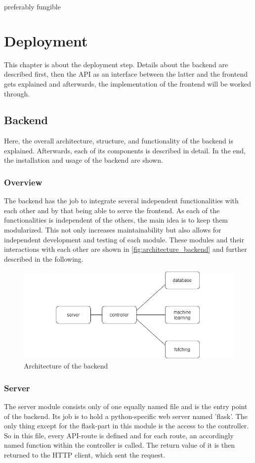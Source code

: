 
preferably fungible

\chapter{Deployment}
This chapter is about the deployment step. Details about the backend are described first, then the API as an interface between the latter and the frontend gets explained and afterwards, the implementation of the frontend will be worked through.
\section{Backend}
Here, the overall architecture, structure, and functionality of the backend is explained. Afterwards, each of its components is described in detail. In the end, the installation and usage of the backend are shown.
\subsection{Overview}
The backend has the job to integrate several independent functionalities with each other and by that being able to serve the frontend.
As each of the functionalities is independent of the others, the main idea is to keep them modularized. This not only increases maintainability but also allows for independent development and testing of each module. These modules and their interactions with each other are shown in \autoref{fig:architecture_backend} and further described in the following.
\begin{figure}[H]
\centering
\includegraphics[width=1\textwidth]{images/modules.png}
\caption{Architecture of the backend}
\label{fig:architecture_backend}
\end{figure}

\subsection{Server}
The server module consists only of one equally named file and is the entry point of the backend. Its job is to hold a python-specific web server named 'flask'. The only thing except for the flask-part in this module is the access to the controller.
\newline
So in this file, every API-route is defined and for each route, an accordingly named function within the controller is called. The return value of it is then returned to the HTTP client, which sent the request.

